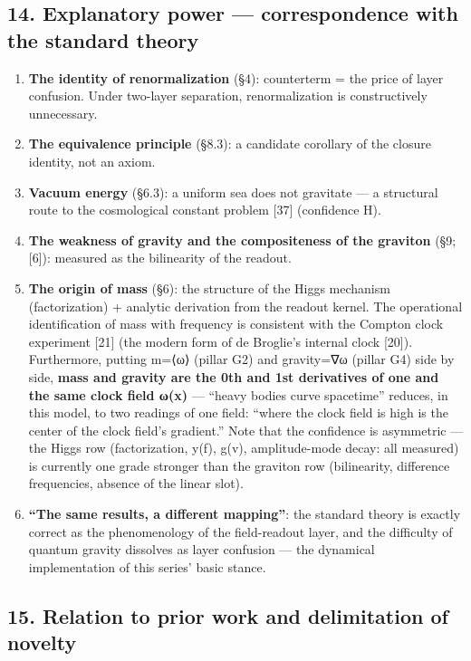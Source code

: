 \documentclass[
]{article}
\providecommand{\tightlist}{%
  \setlength{\itemsep}{0pt}\setlength{\parskip}{0pt}}
\begin{document}
\subsection{14. Explanatory power --- correspondence with the standard
theory}\label{explanatory-power-correspondence-with-the-standard-theory}

\begin{enumerate}
\def\labelenumi{\arabic{enumi}.}
\tightlist
\item
  \textbf{The identity of renormalization} (§4): counterterm = the price
  of layer confusion. Under two-layer separation, renormalization is
  constructively unnecessary.
\item
  \textbf{The equivalence principle} (§8.3): a candidate corollary of
  the closure identity, not an axiom.
\item
  \textbf{Vacuum energy} (§6.3): a uniform sea does not gravitate --- a
  structural route to the cosmological constant problem {[}37{]}
  (confidence H).
\item
  \textbf{The weakness of gravity and the compositeness of the graviton}
  (§9; {[}6{]}): measured as the bilinearity of the readout.
\item
  \textbf{The origin of mass} (§6): the structure of the Higgs mechanism
  (factorization) + analytic derivation from the readout kernel. The
  operational identification of mass with frequency is consistent with
  the Compton clock experiment {[}21{]} (the modern form of de Broglie's
  internal clock {[}20{]}). Furthermore, putting m=⟨ω⟩ (pillar G2) and
  gravity=∇ω (pillar G4) side by side, \textbf{mass and gravity are the
  0th and 1st derivatives of one and the same clock field ω(x)} ---
  ``heavy bodies curve spacetime'' reduces, in this model, to two
  readings of one field: ``where the clock field is high is the center
  of the clock field's gradient.'' Note that the confidence is
  asymmetric --- the Higgs row (factorization, y(f), g(v),
  amplitude-mode decay: all measured) is currently one grade stronger
  than the graviton row (bilinearity, difference frequencies, absence of
  the linear slot).
\item
  \textbf{``The same results, a different mapping''}: the standard
  theory is exactly correct as the phenomenology of the field-readout
  layer, and the difficulty of quantum gravity dissolves as layer
  confusion --- the dynamical implementation of this series' basic
  stance.
\end{enumerate}

\subsection{15. Relation to prior work and delimitation of
novelty}\label{relation-to-prior-work-and-delimitation-of-novelty}
\end{document}
